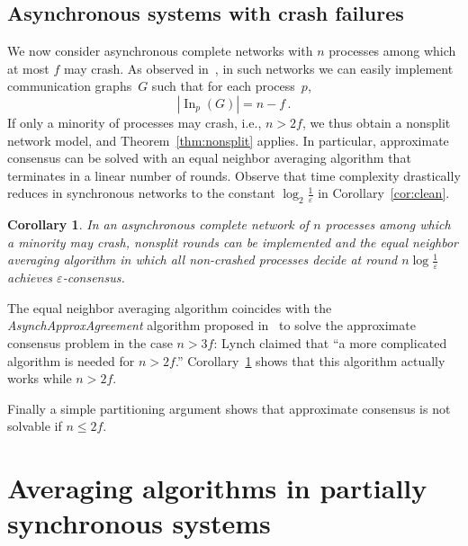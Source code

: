 \documentclass[a4paper]{article}
\theoremstyle{newthm}
\newtheorem{cor}[thm]{Corollary}
\renewcommand{\leq}{\leqslant}
\DeclareMathOperator\In{In}
\begin{document}
\subsection{Asynchronous systems with crash failures}

We now consider asynchronous complete networks with $n$ processes among which at most
	$f$ may crash.
As observed in~\cite{CS09}, in such networks we can easily  implement 
	 communication graphs~$G$ such that for each process~$p$,
	$$ | \In_p (G) | = n-f \, . $$
If only a minority of processes may crash, i.e., $n>2f$, we thus obtain a nonsplit network model,
	and Theorem~\ref{thm:nonsplit} applies.	
In particular, approximate consensus can be solved with an equal neighbor averaging algorithm that 
	terminates in a linear number of  rounds.	
Observe that   time complexity drastically reduces in synchronous networks to the constant $\log_2  \frac{1}{\varepsilon} $
	in Corollary~\ref{cor:clean}.

\begin{cor}\label{cor:asynch}
In an asynchronous complete network of $n$ processes among which a minority may crash, 
	nonsplit rounds can be implemented and the equal neighbor averaging 
	algorithm 	in which all non-crashed processes decide at  round
	$n  \log  \frac{1}{\varepsilon} $ 
	achieves $\varepsilon$-consensus.
\end{cor}

The equal neighbor averaging algorithm  coincides with the {\em AsynchApproxAgreement}
	algorithm proposed in~\cite{Lyn96} to solve the approximate consensus problem in the
	case $n>3f$: Lynch claimed that ``a more complicated algorithm is needed for $n>2f$.''
Corollary~\ref{cor:asynch} shows that this algorithm actually works while  $n>2f$. 

Finally a simple partitioning argument shows that approximate consensus is not 
	solvable if $n\leq 2f$.




\section{Averaging algorithms in partially synchronous systems}
\end{document}
